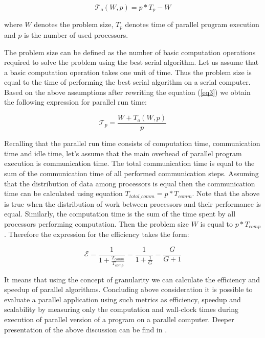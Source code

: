 \documentclass[runningheads]{llncs}
\begin{document}
\begin{equation}
\label{eq3}
\mathcal T_o (W,p) = p\ast T_p - W
\end{equation}

\noindent where $W$ denotes the problem size, $T_{p }$ denotes time
of parallel program execution and $p$ is the number of used processors.

The problem size can be defined as the number of basic computation operations required to solve the problem using the best serial algorithm. Let us assume that a basic computation operation takes one unit of time. Thus the problem size is equal to the time of performing the best serial algorithm on a serial computer. Based
on the above assumptions after rewriting the equation (\ref{eq3}) we obtain the following expression for parallel run time:

\begin{equation}
\label{eq4}
\mathcal T_p = \frac{W + T_o (W,p)}{p}
\end{equation}

Recalling that the parallel run time consists of computation time, communication time and idle time, let's assume that the main overhead of parallel program execution is communication time.
The total communication time is equal to the sum of the communication time of all performed communication steps. Assuming that the distribution of data among processors is equal then the communication time can be calculated using equation $T_{total\_comm }= p * T_{comm }$. Note that the above is true
when the distribution of work between processors and their
performance is equal. Similarly, the computation time is the sum
of the time spent by all processors performing computation. Then
the problem size $W$ is equal to $p* T_{comp}$. Therefore the expression for the efficiency takes the form: 

\begin{equation}
\label{eq5} 
\mathcal E = \frac{1}{1 + \frac{T_{comm} }{T_{comp} }} =
\frac{1}{1 + \frac{1}{G}} = \frac{G}{G + 1}
\end{equation}

It means that using the concept of granularity we can calculate the efficiency
and speedup of parallel algorithms. Concluding above consideration it is possible to evaluate a parallel application using such metrics as efficiency, speedup and scalability by measuring only the computation and wall-clock times during execution of parallel version of a program on a parallel computer. Deeper presentation of the above discussion can be find in \cite{kwiatkowski_2}.
\end{document}
